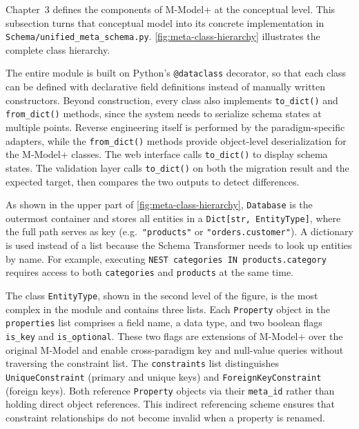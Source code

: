  Chapter~3 defines the components of M-Model+ at the conceptual level. This subsection turns that conceptual model into its concrete implementation in
  \texttt{Schema/unified\_meta\_schema.py}. \autoref{fig:meta-class-hierarchy} illustrates the complete class hierarchy.

 The entire module is built on Python's \texttt{@dataclass} decorator, so that each class can be defined with declarative field definitions instead of manually written
  constructors. Beyond construction, every class also implements \texttt{to\_dict()} and \texttt{from\_dict()} methods, since the system needs to serialize schema states
  at multiple points. Reverse engineering itself is performed by the paradigm-specific adapters, while the \texttt{from\_dict()} methods provide object-level deserialization for the M-Model+ classes. The web interface calls \texttt{to\_dict()} to
  display schema states. The validation layer calls \texttt{to\_dict()} on both the migration result and the expected target, then compares the two outputs to detect differences.

  As shown in the upper part of \autoref{fig:meta-class-hierarchy}, \texttt{Database} is the outermost container and stores all entities in a \texttt{Dict[str,
  EntityType]}, where the full path serves as key (e.g.\ \texttt{"products"} or \texttt{"orders.customer"}). A dictionary is used instead of a list because the Schema Transformer needs to look up entities by name. For example, executing \texttt{NEST categories IN products.category} requires access to both \texttt{categories} and \texttt{products} at the same time.

  The class \texttt{EntityType}, shown in the second level of the figure, is the most complex in the module and contains three lists. Each \texttt{Property} object in
  the \texttt{properties} list comprises a field name, a data type, and two boolean flags \texttt{is\_key} and \texttt{is\_optional}. These two flags are extensions of
  M-Model+ over the original M-Model and enable cross-paradigm key and null-value queries without traversing the constraint list. The \texttt{constraints} list
  distinguishes \texttt{UniqueConstraint} (primary and unique keys) and \texttt{ForeignKeyConstraint} (foreign keys). Both reference \texttt{Property} objects via their
  \texttt{meta\_id} rather than holding direct object references. This indirect referencing scheme ensures that constraint relationships do not become invalid when a
  property is renamed.

